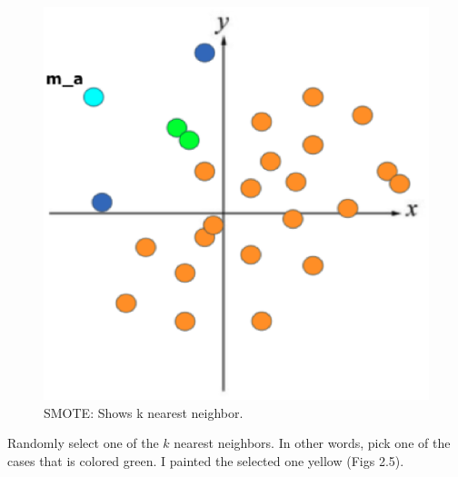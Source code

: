 \begin{center}
    \begin{figure}[ht]
        \caption{SMOTE: Shows k nearest neighbor.}
        \label{tab:team-rating-features}
        \begin{center}
            \includegraphics[scale=0.6]{image/smote3.eps}
        \end{center}
    \end{figure}
\end{center}

\clearpage

Randomly select one of the $k$ nearest neighbors. In other words, pick one of the cases that is colored green. I painted the selected one yellow (Figs 2.5).

